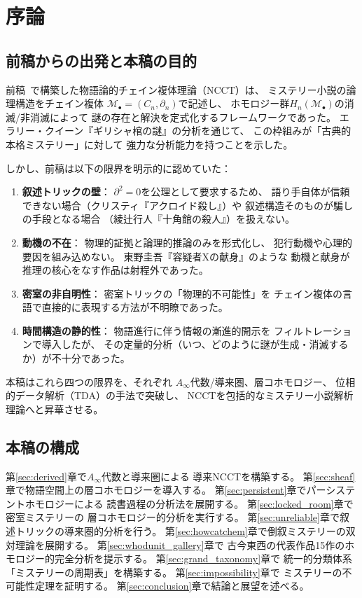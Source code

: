 \documentclass[12pt,twocolumn]{ltjsarticle}
\newcommand{\Mys}{\mathcal{M}}
\begin{document}
\section{序論}

\subsection{前稿からの出発と本稿の目的}

前稿~\cite{Ishibashi2026I}で構築した物語論的チェイン複体理論（NCCT）は、
ミステリー小説の論理構造をチェイン複体
$\Mys_\bullet = (C_n, \partial_n)$で記述し、
ホモロジー群$H_n(\Mys_\bullet)$の消滅/非消滅によって
謎の存在と解決を定式化するフレームワークであった。
エラリー・クイーン『ギリシャ棺の謎』の分析を通じて、
この枠組みが「古典的本格ミステリー」に対して
強力な分析能力を持つことを示した。

しかし、前稿は以下の限界を明示的に認めていた：

\begin{enumerate}
\item \textbf{叙述トリックの壁}：
$\partial^2 = 0$を公理として要求するため、
語り手自体が信頼できない場合（クリスティ『アクロイド殺し』）や
叙述構造そのものが騙しの手段となる場合
（綾辻行人『十角館の殺人』）を扱えない。

\item \textbf{動機の不在}：
物理的証拠と論理的推論のみを形式化し、
犯行動機や心理的要因を組み込めない。
東野圭吾『容疑者Xの献身』のような
動機と献身が推理の核心をなす作品は射程外であった。

\item \textbf{密室の非自明性}：
密室トリックの「物理的不可能性」を
チェイン複体の言語で直接的に表現する方法が不明瞭であった。

\item \textbf{時間構造の静的性}：
物語進行に伴う情報の漸進的開示を
フィルトレーションで導入したが、
その定量的分析（いつ、どのように謎が生成・消滅するか）が不十分であった。
\end{enumerate}

本稿はこれら四つの限界を、それぞれ
$A_\infty$代数/導来圏、層コホモロジー、
位相的データ解析（TDA）の手法で突破し、
NCCTを包括的なミステリー小説解析理論へと昇華させる。

\subsection{本稿の構成}

第\ref{sec:derived}章で$A_\infty$代数と導来圏による
導来NCCTを構築する。
第\ref{sec:sheaf}章で物語空間上の層コホモロジーを導入する。
第\ref{sec:persistent}章でパーシステントホモロジーによる
読書過程の分析法を展開する。
第\ref{sec:locked_room}章で密室ミステリーの
層コホモロジー的分析を実行する。
第\ref{sec:unreliable}章で叙述トリックの導来圏的分析を行う。
第\ref{sec:howcatchem}章で倒叙ミステリーの双対理論を展開する。
第\ref{sec:whodunit_gallery}章で
古今東西の代表作品15作のホモロジー的完全分析を提示する。
第\ref{sec:grand_taxonomy}章で
統一的分類体系「ミステリーの周期表」を構築する。
第\ref{sec:impossibility}章で
ミステリーの不可能性定理を証明する。
第\ref{sec:conclusion}章で結論と展望を述べる。
\end{document}
